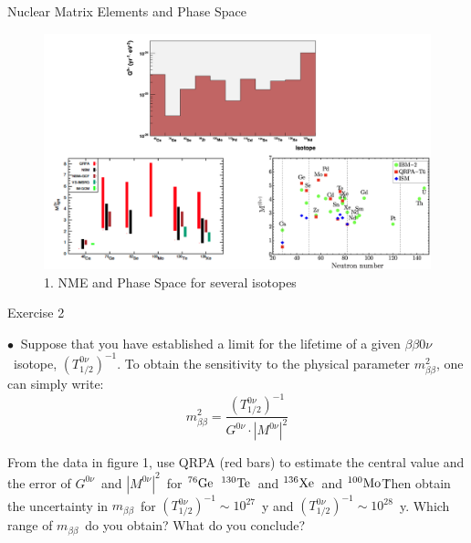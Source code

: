 \documentclass [aspectratio=169]{beamer}
\newcommand{\bbonu}{\ensuremath{\beta\beta0\nu}}
\newcommand{\mbb}{\ensuremath{m_{\beta\beta}}}
\newcommand{\mbbsq}{\ensuremath{m_{\beta\beta}^2}}
\newcommand{\tonu}{\ensuremath{(T_{1/2}^{0\nu})^{-1}}}
\newcommand{\gonu}{\ensuremath{G^{0\nu}}}
\newcommand{\monu}{\ensuremath{|M^{0\nu}|^2}}
\newcommand{\XE}{\ensuremath{{}^{136}{\rm Xe}}}
\newcommand{\GE}{\ensuremath{{}^{76}{\rm Ge}}}
\newcommand{\TE}{\ensuremath{{}^{130}{\rm Te}}}
\newcommand{\MO}{\ensuremath{{}^{100}{\rm Mo}}}
\begin{document}
\begin{frame}{Nuclear Matrix Elements and Phase Space}
\begin{figure}
\includegraphics[scale=0.20]{nme2.png}
\caption{1. NME and Phase Space for several isotopes}

\end{figure}
\end{frame}


\begin{frame}{Exercise 2}

$\bullet~$ Suppose that you have established a limit for the lifetime of a given \bbonu\ isotope, 
\tonu. To obtain the sensitivity to the physical parameter \mbbsq, one can simply write:
\[
\mbbsq = \frac{\tonu}{\gonu\cdot\monu}
\]

From the data in figure 1, use QRPA (red bars) to estimate the central value and the error of \gonu\ and \monu\ for \GE\, \TE\ and \XE\ and \MO\. Then obtain the uncertainty in \mbb\ for 
$\tonu \sim 10^{27}$~y and $\tonu \sim 10^{28}$~y. Which range of \mbb\ do you obtain? What do you conclude?

\end{frame}

\end{document}
